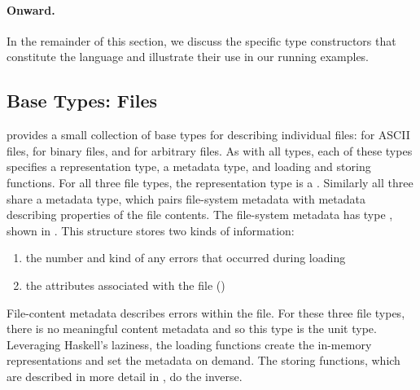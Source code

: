 
\paragraph{Onward.}
In the remainder of this section, we discuss the specific type
constructors that constitute the \forest{} language and illustrate
their use in our running examples.  


\subsection{Base Types: Files}
\label{sec:basics}
\forest{} provides a small collection of base types for describing
individual files:  for ASCII files,  for
binary files, and 
 for arbitrary files.  As with all \forest{} types, each of
these types specifies a representation type, a metadata type, and 
loading and storing functions. 
For all three file types, the representation type is a
.
Similarly all three share a metadata type, which
pairs file-system metadata
with metadata describing properties of the file contents.  The
file-system metadata has type , shown in
.  
%
%
This structure stores two kinds of
information: 
\begin{enumerate} 
\item the number and kind of any errors that occurred during loading 
\item the attributes associated with the file ()
\end{enumerate} %
File-content metadata describes errors within the file.
For these three file types, there is
no meaningful content metadata and so this type is the unit type.
Leveraging Haskell's laziness, the loading functions create the
in-memory representations and set the metadata on demand.  The storing
functions, which are described in more detail in ,
do the inverse.

